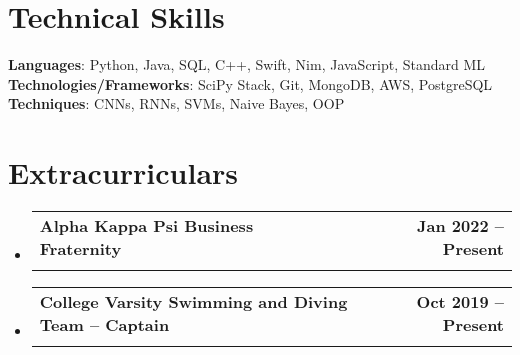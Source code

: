 \documentclass[letterpaper,11pt]{article}
\makeatletter
\newcommand{\resumeSubheading}[4]{
  \vspace{-2pt}\item
    \begin{tabular*}{1.0\textwidth}[t]{l@{\extracolsep{\fill}}r}
      \textbf{#1} & \textbf{\small #2} \\
      \textit{\small#3} & \textit{\small #4} \\
    \end{tabular*}\vspace{-7pt}
}
\newcommand{\resumeSubHeadingListStart}{\begin{itemize}[leftmargin=0.0in, label={}]}
\newcommand{\resumeSubHeadingListEnd}{\end{itemize}}
\makeatother
\begin{document}
%
\section{Technical Skills}
 \begin{itemize}[leftmargin=0.15in, label={}]
    \small{\item{
     \textbf{Languages}{: Python, Java, SQL, C++, Swift, Nim, JavaScript, Standard ML} \\
     \textbf{Technologies/Frameworks}{: SciPy Stack, Git, MongoDB, AWS, PostgreSQL} \\
     \textbf{Techniques}{: CNNs, RNNs, SVMs, Naive Bayes, OOP} \\
    }}
 \end{itemize}
 \vspace{-16pt}


\section{Extracurriculars}
    \resumeSubHeadingListStart
        \resumeSubheading{Alpha Kappa Psi Business Fraternity}{Jan 2022 -- Present}{}{} \vspace{-13.5pt}
        \resumeSubheading{College Varsity Swimming and Diving Team -- Captain}{Oct 2019 -- Present}{}{}
    \resumeSubHeadingListEnd
\end{document}
